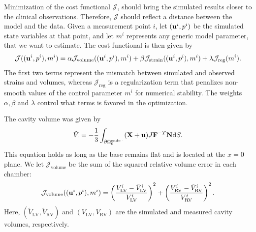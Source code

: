 Minimization of the cost functional $\mathcal{J}$, should bring
the simulated results closer to the clinical observations. Therefore,
$\mathcal{J}$ should reflect a distance between the model and the data.  
Given a measurement point $i$, let $(\mathbf{u}^i,p^i)$ be the simulated state
variables at that point, and let $m^i$ represents any generic model
parameter, that we want to estimate. The cost functional is then
given by
\begin{equation}
  \mathcal{J}((\mathbf{u}^i,p^i), m^i)
  = \alpha \mathcal{J}_{\mathrm{volume}}((\mathbf{u}^i, p^i), m^i)
  + \beta \mathcal{J}_{\mathrm{strain}}((\mathbf{u}^i, p^i), m^i)
  + \lambda \mathcal{J}_{\mathrm{reg}}(m^i).
  \label{paper3:eq:total_functional}
\end{equation}
The first two terms represent the mismatch between simulated and
observed strains and volumes, whereas $\mathcal{J}_{\mathrm{reg}} $ is
a regularization term that penalizes non-smooth values of the control
parameter $m^i$ for numerical stability. The weights $\alpha, \beta$
and $\lambda$ control what terms is favored in the optimization.


The cavity volume was given by
\begin{equation}
  \tilde{V}_{\cdot} = - \frac{1}{3} \int_{\partial \Omega_0^{\mathrm{endo}\; \cdot}} (\mathbf{X} + \mathbf{u} )J \mathbf{F}^{-T} \mathbf{N} \mathrm{d} S.
\end{equation}
This equation holds as long as the base remains flat and is located at the $x=
0$ plane. We let $\mathcal{J}_{\mathrm{volume}}$ be the sum of the
squared relative volume error in each chamber:
\begin{equation}
  \mathcal{J}_{\mathrm{volume}}((\mathbf{u}^i, p^i), m^i) =
  \left( \frac{V_{\text{LV}}^i - \tilde{V}_{\text{LV}}^i}{V_{\text{LV}}^i} \right)^2
  + \left( \frac{V_{\text{RV}}^i- \tilde{V}_{\text{RV}}^i}{V_{\text{RV}}^i} \right)^2.
  \label{paper3:eq:I_vol}
\end{equation}
Here, $(\tilde{V}_{\text{LV}}, \tilde{V}_{\text{RV}})$ and
$(V_{\text{LV}}, V_{\text{RV}}) $ are the simulated and measured
cavity volumes, respectively.

